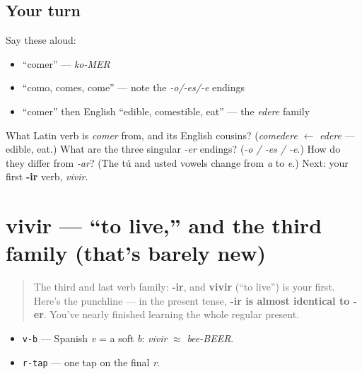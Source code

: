 \subsection*{Your turn}
Say these aloud:

\begin{itemize}
\raggedright
  \item \textquotedblleft{}comer\textquotedblright{} — \emph{ko-MER}
  \item \textquotedblleft{}como, comes, come\textquotedblright{} — note the \emph{-o/-es/-e} endings
  \item \textquotedblleft{}comer\textquotedblright{} then English \textquotedblleft{}edible, comestible, eat\textquotedblright{} — the \emph{edere} family
\end{itemize}

\begin{tcolorbox}[breakable,colback=teal!4,colframe=teal!35!black,title={Before you move on}]
What Latin verb is \emph{comer} from, and its English cousins? (\emph{comedere} $\leftarrow$ \emph{edere} — edible, eat.) What are the three singular \emph{-er} endings? (\emph{-o / -es / -e}.) How do they differ from \emph{-ar}? (The tú and usted vowels change from \emph{a} to \emph{e}.) Next: your first \textbf{-ir} verb, \emph{vivir}.
\end{tcolorbox}
\section[vivir]{vivir — \textquotedblleft{}to live,\textquotedblright{} and the third family (that's barely new)}

\label{lesson:ES-C07-vivir}



\begin{quote}
The third and last verb family: \textbf{-ir}, and \textbf{vivir} (\textquotedblleft{}to live\textquotedblright{}) is your first. Here's the punchline — in the present tense, \textbf{-ir is almost identical to -er}. You've nearly finished learning the whole regular present.
\end{quote}

\begin{sounds}
\begin{itemize}
\raggedright
  \item \texttt{v-b} — Spanish \emph{v} = a soft \emph{b}: \emph{vivir} $\approx$ \emph{bee-BEER}.
  \item \texttt{r-tap} — one tap on the final \emph{r}.
\end{itemize}
\end{sounds}

